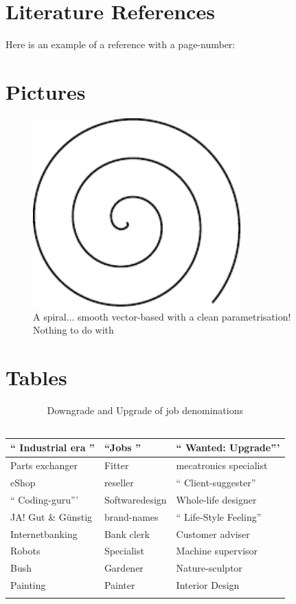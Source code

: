 \section{Literature References}
Here is an example of a reference with a page-number: \cite[S. 6]{DueckKo:2016}


\section{Pictures}

\begin{figure}[h]
\centering
\includegraphics[width=8cm]{pics/spiral.pdf}
\caption{A spiral... smooth vector-based with a clean parametrisation! \\ Nothing to do with \cite{Gage:18}}\label{fig:spiral}
\end{figure}
\FloatBarrier

\section{Tables}

\begin{table}[H]
\small
\centering
\begin{tabular}{p{5cm}|l|p{3cm}}
`` Industrial era '' &  ``Jobs '' & `` Wanted: Upgrade''' \\ \hline
Parts exchanger & Fitter & mecatronics specialist \\
eShop & reseller & `` Client-suggester'' \\
`` Coding-guru''' & Softwaredesign & Whole-life designer \\
JA! Gut \& Günstig & brand-names & `` Life-Style Feeling'' \\
Internetbanking & Bank clerk & Customer adviser \\
Robots & Specialist & Machine supervisor \\
Bush & Gardener & Nature-sculptor \\
Painting & Painter & Interior Design \\
 &  & \\
\end{tabular}
\caption[Downgrade and upgrade of job denominations]{Downgrade and Upgrade of job denominations \\ \ \ \ \cite{DueckKo:2016}}
\label{tab:Downgrade and Upgrade of job denominations}
\end{table} 

